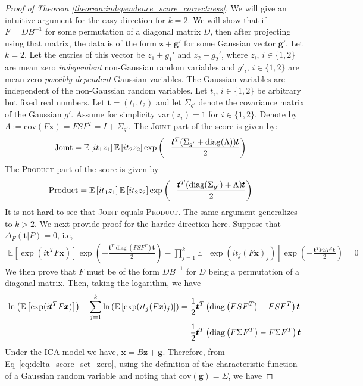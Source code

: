 \documentclass[letterpaper]{article}
\newcommand{\ba}[1]{\begin{align}#1\end{align}}
\newcommand{\bas}[1]{\begin{align*}#1\end{align*}}
\newcommand{\bx}{\pmb{x}}
\newcommand{\bt}{\pmb{t}}
\newcommand{\bg}{\pmb{g}}
\newcommand{\bz}{\pmb{z}}
\newcommand{\E}{\mathbb{E}}
\newcommand{\cov}{\text{cov}}
\newcommand{\var}{\text{var}}
\newcommand{\bb}[1]{\left(#1\right)}
\newcommand{\bbb}[1]{\left[#1\right]}
\DeclareMathOperator{\diag}{diag}
\begin{document}
\begin{proof}[Proof of Theorem \ref{theorem:independence_score_correctness}]

We will give an intuitive argument for the easy direction for $k=2$. 
We will show that if $F=DB^{-1}$ for some permutation of a diagonal matrix $D$, then after projecting using that matrix, the data is of the form $\bz+\bg'$ for some Gaussian vector $\bg'$.  Let $k=2$.
Let the entries of this vector be $z_1+g_1'$ and $z_2+g_2'$, where $z_i$, $i\in\{1,2\}$ are mean zero \textit{independent} non-Gaussian random variables and $g'_i$, $i\in\{1,2\}$ are mean zero \textit{possibly dependent} Gaussian variables. The Gaussian variables are independent of the non-Gaussian random variables. Let $t_i$, $i\in\{1,2\}$ be arbitrary but fixed real numbers.  Let $\bt=(t_1, t_2)$ and let $\Sigma_{g'}$ denote the covariance matrix of the Gaussian $g'$. Assume for simplicity $\var(z_i)=1$ for $i\in\{1,2\}$. Denote by $\Lambda:=\cov(F\bx)=FSF^T=I+\Sigma_{g'}$. The \textsc{Joint} part of the score is given by:
\bas{
\text{\textsc{Joint}}%
&=\E\bbb{it_1z_1}\E\bbb{it_2z_2}\exp\bb{-\frac{\bt^T(\Sigma_{g'}+\diag(\Lambda))\bt}{2}}
}
The \textsc{Product} part of the score is given by
\bas{
\text{\textsc{Product}}%
&=\E\bbb{it_1z_1}\E\bbb{it_2z_2}\exp\bb{-\frac{\bt^T(\diag(\Sigma_{g'})+\Lambda)\bt}{2}}
}
It is not hard to see that \textsc{Joint} equals \textsc{Product}. The same argument generalizes to $k>2$. We next provide proof for the harder direction here. Suppose that $\Delta_F(\bt|P) = 0$, i.e, 
\ba{
\E\bbb{\exp(i\bt^TF\bx)}\exp\bb{-\frac{\bt^T\diag\bb{F S F^T}\bt}{2}}-\prod_{j=1}^k\E\bbb{\exp(i t_j (F\bx)_j)}\exp\bb{-\frac{\bt^TFS F^T \bt}{2}} = 0 \label{eq:delta_score_set_zero}
}
We then prove that $F$ must be of the form $DB^{-1}$ for $D$ being a permutation of a diagonal matrix. Then, taking the logarithm, we have
\ba{
    \ln\bb{\E\bbb{\exp(i\bt^TF\bx)}} - \sum_{j=1}^{k}\ln\bb{\E\bbb{\exp(i t_j (F\bx)_j)}} &= \frac{1}{2}\bt^T\bb{\diag\bb{F S F^T} - FS F^T}\bt \notag \\ 
    &= \frac{1}{2}\bt^T\bb{\diag\bb{F \Sigma F^T} - F \Sigma F^T}\bt \notag
}
Under the ICA model we have, $\bx = B\bz + \bg$. Therefore, from Eq~\ref{eq:delta_score_set_zero}, using the definition of the characteristic function of a Gaussian random variable and noting that $\cov\bb{\bg} = \Sigma$, we have

\end{proof}
\end{document}
